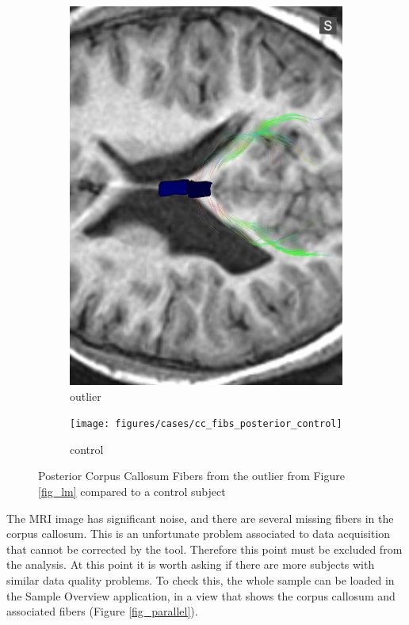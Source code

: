 \documentclass[twocolumn]{svjour3}
\begin{document}
\begin{figure}
\begin{center}
\begin{subfigure}[b]{0.48\linewidth}
\includegraphics[width=\textwidth]{figures/cases/cc_fibs_posterior_outlier}
\caption{\label{fig_cc_outlier}outlier}
\end{subfigure}\hfill
\begin{subfigure}[b]{0.48\linewidth}
\texttt{[image: figures/cases/cc\_fibs\_posterior\_control]}
\caption{\label{fig_cc_control}control}
\end{subfigure}
\end{center}
 \caption{\label{fig_subject2} Posterior Corpus Callosum Fibers from the outlier from Figure \ref{fig_lm} compared to a control subject}
\end{figure}

The MRI image has significant noise, and there are several missing fibers in the corpus callosum. This is an unfortunate problem associated to data acquisition that cannot be corrected by the tool. Therefore this point must be excluded from the analysis. At this point it is worth asking if there are more subjects with similar data quality problems. To check this, the whole sample can be loaded in the Sample Overview application, in a view that shows the corpus callosum and associated fibers (Figure \ref{fig_parallel}).
\end{document}
